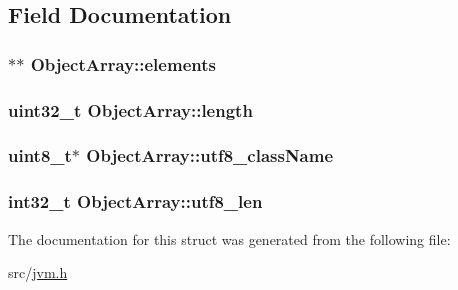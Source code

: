 \subsection{Field Documentation}
\subsubsection[{\texorpdfstring{elements}{elements}}]{$\ast$$\ast$ Object\+Array\+::elements}\hypertarget{structObjectArray_a0f945929c1656e6c0fd521bb53618f78}{}\label{structObjectArray_a0f945929c1656e6c0fd521bb53618f78}
\subsubsection[{\texorpdfstring{length}{length}}]{\setlength{\rightskip}{0pt plus 5cm}uint32\+\_\+t Object\+Array\+::length}\hypertarget{structObjectArray_aa2263f92dcbf379ff869c4eefaabc715}{}\label{structObjectArray_aa2263f92dcbf379ff869c4eefaabc715}
\subsubsection[{\texorpdfstring{utf8\+\_\+class\+Name}{utf8_className}}]{\setlength{\rightskip}{0pt plus 5cm}uint8\+\_\+t$\ast$ Object\+Array\+::utf8\+\_\+class\+Name}\hypertarget{structObjectArray_a6faf7707737d9d8f5d6261334b2a5a9a}{}\label{structObjectArray_a6faf7707737d9d8f5d6261334b2a5a9a}
\subsubsection[{\texorpdfstring{utf8\+\_\+len}{utf8_len}}]{\setlength{\rightskip}{0pt plus 5cm}int32\+\_\+t Object\+Array\+::utf8\+\_\+len}\hypertarget{structObjectArray_ad5fe6b2b494654afd05b58836b308d21}{}\label{structObjectArray_ad5fe6b2b494654afd05b58836b308d21}


The documentation for this struct was generated from the following file\+:\begin{DoxyCompactItemize}
\item 
src/\hyperlink{jvm_8h}{jvm.\+h}\end{DoxyCompactItemize}
